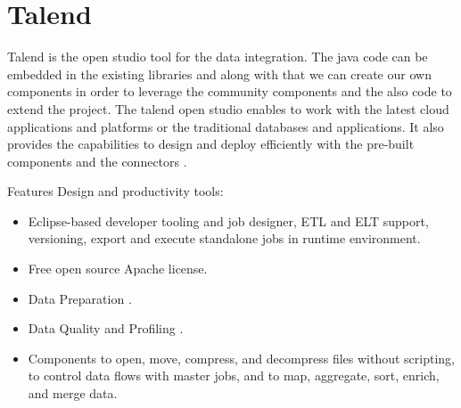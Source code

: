 \section{Talend}
Talend is the open studio tool for the data integration. The java code can 
be embedded in the existing libraries and along with that we can create our 
own components in order to leverage the community components and the also code 
to extend the project. The talend open studio enables to work with the 
latest cloud applications and platforms or the traditional databases and 
applications. It also provides the capabilities to design and deploy 
efficiently with the pre-built components 
and the connectors \cite{hid-sp18-412-talend_open_studio}.

Features Design and productivity tools: 
\begin{itemize}
\item Eclipse-based developer tooling and 
      job designer, ETL and ELT support, versioning, export and 
      execute standalone jobs in runtime environment.

\item Free open source Apache license.

\item Data Preparation \cite{hid-sp18-412-data_preparation}. 

\item Data Quality and Profiling \cite{hid-sp18-412-data_quality}.

\item Components to open, move, compress, and decompress files without 
      scripting, to control data flows with master jobs, and to map, 
      aggregate, sort, enrich, and merge data.
\end{itemize}
